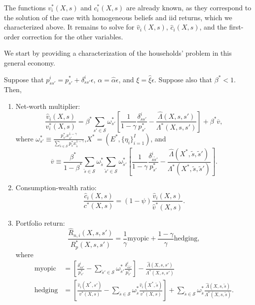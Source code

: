 The functions $v^*_i(X,s)$ and $c^*_i(X,s)$ are already known, as they correspond to the solution of the case with homogeneous beliefs and iid returns, which we characterized above. It remains to solve for $\hat{v}_i(X,s)$,  $\hat{c}_i(X,s)$, and the first-order correction for the other variables. 

We start by providing a characterization of the households' problem in this general economy. 
\begin{proposition}\label{oa_investor_perturbation} Suppose that $p_{ss'}^i = p_{s'}^* + \delta_{ss'}^i \epsilon$, $\alpha = \hat{\alpha} \epsilon$, and $\xi = \hat{\xi} \epsilon$. Suppose also that $\beta^* < 1$. Then,
\begin{enumerate}
    \item Net-worth multiplier:
\begin{equation}
    \frac{\hat{v}_i(X,s)}{v_i^*(X,s)}  =  \beta^*  \sum_{s'\in \mathcal{S}} \omega^*_{s'}\left[\frac{1}{1-\gamma} \frac{\delta_{ss'}^i}{p_{s'}^*} -\frac{\hat{\Lambda}(X,s,s')}{\Lambda^*(X,s,s')} \right] +\beta^* \overline{v},
\end{equation}
where $\omega_{s'}^* \equiv\frac{p_{s'}^* x_{s'}^{1-\gamma}}{\sum_{\tilde{s} \in \mathcal{S}} p_{\tilde{s}}^* x_{\tilde{s}}^{1-\gamma}}$,$X^* = (E^*, \{\eta_i\}_{i=1}^I)$, and
\begin{equation}
    \overline{v} \equiv \frac{ \beta^* }{1-\beta^*}\sum_{\tilde{s}\in \mathcal{S}}  \omega^*_{\tilde{s}}  \sum_{\tilde{s}'\in \mathcal{S}} \omega^*_{\tilde{s}'}\left[\frac{ 1}{1-\gamma} \frac{\delta_{\tilde{s}\tilde{s}'}^i}{p_{\tilde{s}'}^*} -\frac{\hat{\Lambda}(X^*,\tilde{s},\tilde{s}')}{\Lambda^*(X^*,\tilde{s},\tilde{s}')}  \right].
\end{equation}
    
    \item Consumption-wealth ratio:
    \begin{equation}
    \frac{\hat{c}_i(X,s)}{c^*(X,s)} =  (1-\psi) \frac{\hat{v}_i(X,s)}{\hat{v}^*(X,s)}.
\end{equation}

    \item Portfolio return:
\begin{equation}
    \frac{\hat{R}_{n,i}(X,s,s')}{R^*_p(X,s,s')} = \frac{1}{\gamma}  \text{myopic}  + \frac{1-\gamma}{\gamma} \text{hedging},
\end{equation}
where 
\begin{align}
    \text{myopic} &= \left[\frac{\delta_{ss'}^i}{p_{s'}^*} - \sum_{\tilde{s}'\in\mathcal{S}} \omega^*_{\tilde{s}'} \frac{\delta_{s\tilde{s}'}^i}{p_{\tilde{s}'}^*}\right] - \frac{\hat{\Lambda}(X,s,s')}{\Lambda^*(X,s,s')}  \\
    \text{hedging} &= \left[\frac{\hat{v}_i(X^*,s')}{v^*(X,s)}-\sum_{\tilde{s} \in \mathcal{S}}\omega^*_{\tilde{s}} 
    \frac{\hat{v}_i(X^*,\tilde{s})}{v^*(X,s)}\right]+
     \sum_{\tilde{s} \in \mathcal{S}}\omega^*_{\tilde{s}} \frac{\hat{\Lambda}(X,s,\tilde{s})}{\Lambda^*(X,s,\tilde{s})}.
\end{align}
\end{enumerate}
\end{proposition}
